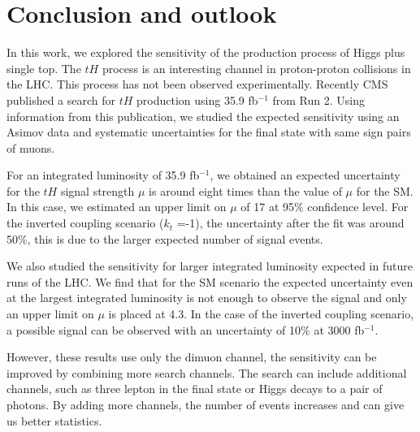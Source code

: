 
\chapter{Conclusion and outlook}
In this work, we explored the sensitivity of the production process of Higgs plus single top.
The $tH$ process is an interesting channel in proton-proton collisions in the LHC. This process has not been observed experimentally. Recently CMS published a search for $tH$ production using 35.9 fb$^{-1}$ from Run 2\cite{th1}. Using information from this publication, we studied the expected sensitivity using an Asimov data and systematic uncertainties for the final state with same sign pairs of muons. 

For an integrated luminosity of 35.9 fb$^{-1}$, we obtained an expected uncertainty for the $tH$ signal strength $\mu$ is around eight times than the value of $\mu$ for the SM. In this case, we estimated an upper limit on $\mu$ of 17 at 95$\%$ confidence level. 
For the inverted coupling scenario ($k_t$ =-1), the uncertainty after the fit was around 50$\%$, this is due to the larger expected number of signal events.

We also studied the sensitivity for larger integrated luminosity expected in future runs of the LHC. We find that for the SM scenario the expected uncertainty even at the largest integrated luminosity is not enough to observe the signal and only an upper limit on $\mu$ is placed at 4.3. In the case of the inverted coupling scenario, a possible signal can be observed with an uncertainty of 10$\%$ at 3000 fb$^{-1}$.

However, these results use only the dimuon channel, the sensitivity can be improved by combining more search channels. The search can include additional channels, such as three lepton in the final state or Higgs decays to a pair of photons. By adding more channels, the number of events increases and can give us better statistics. 




